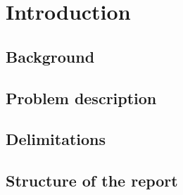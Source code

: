 \documentclass[../main.tex]{subfiles}
\begin{document}
    
    \chapter{Introduction}
    \lipsum[1]
    
    \section{Background}
    \lipsum[1-3]
    
    \section{Problem description}
    \lipsum[1-2]
    
    \section{Delimitations}
    \lipsum[1]
    
    
    \section{Structure of the report}
    \lipsum[1]
    
\biblio
\cleardoublepage
\end{document}
